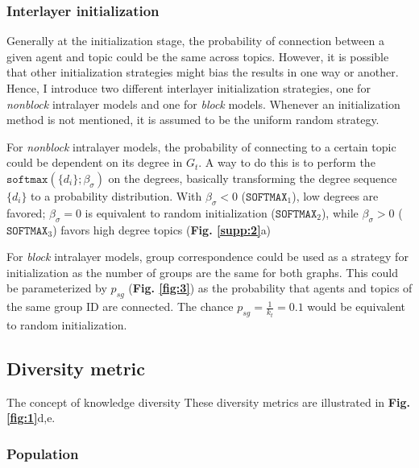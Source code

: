 \documentclass{svproc}
\begin{document}
\vspace{-1em}
\subsubsection*{Interlayer initialization}

Generally at the initialization stage, the probability of connection between a given agent and topic could be the same across topics. However, it is possible that other initialization strategies might bias the results in one way or another. Hence, I introduce two different interlayer initialization strategies, one for \textit{nonblock} intralayer models and one for \textit{block} models. Whenever an initialization method is not mentioned, it is assumed to be the uniform random strategy.

For \textit{nonblock} intralayer models, the probability of connecting to a certain topic could be dependent on its degree in $G_t$. A way to do this is to perform the $\texttt{softmax}\left(\{d_i\}; \beta_{\sigma}\right)$ on the degrees, basically transforming the degree sequence $\{d_i\}$ to a probability distribution. With $\beta_{\sigma} < 0$ ($\texttt{SOFTMAX}_1$), low degrees are favored; $\beta_{\sigma} = 0$ is equivalent to random initialization ($\texttt{SOFTMAX}_2$), while $\beta_{\sigma} > 0$  ($\texttt{SOFTMAX}_3$) favors high degree topics (\textbf{Fig. \ref{supp:2}}a)

For \textit{block} intralayer models, group correspondence could be used as a strategy for initialization as the number of groups are the same for both graphs. This could be parameterized by $p_{sg}$ (\textbf{Fig. \ref{fig:3}}) as the probability that agents and topics of the same group ID are connected. The chance $p_{sg} = \frac{1}{k_t} = 0.1$ would be equivalent to random initialization.

\subsection{Diversity metric} \label{sec:method-diversity}

The concept of knowledge diversity
These diversity metrics are illustrated in \textbf{Fig. \ref{fig:1}}d,e.

\vspace{-1em}
\subsubsection*{Population}
\end{document}
